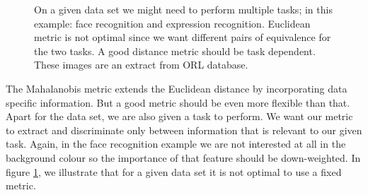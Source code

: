 	\begin{figure}
		 \centering
		\caption{On a given data set we might need to perform multiple tasks; in this example: face recognition and expression recognition. Euclidean metric is not optimal since we want different pairs of equivalence for the two tasks. A good distance metric should be task dependent. These images are an extract from ORL database.}
		\label{fig:face-recog-vs-expression-recog}
	\end{figure}

The Mahalanobis metric extends the Euclidean distance by incorporating data specific information. But a good metric should be even more flexible than that. Apart for the data set, we are also given a task to perform. We want our metric to extract and discriminate only between information that is relevant to our given task. Again, in the face
recognition example we are not interested at all in
the background colour so the importance of that feature
should be down-weighted. In figure \ref{fig:face-recog-vs-expression-recog}, we illustrate that for a given data set it is not optimal to use a fixed metric.

